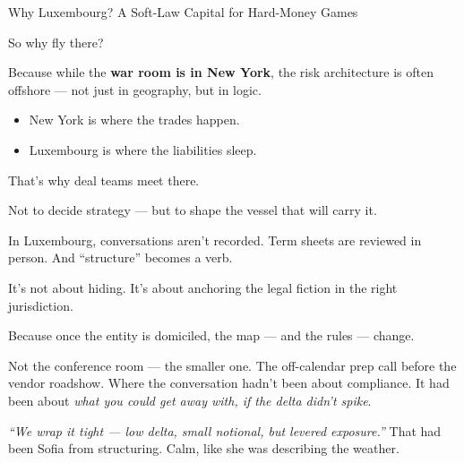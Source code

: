 \begin{HistoricalSidebar}{Why Luxembourg? A Soft-Law Capital for Hard-Money Games}
    \medskip
    
    So why fly there?

    \medskip
    
    Because while the \textbf{war room is in New York}, the risk architecture is often offshore — not just in geography, but in logic.
    
    \medskip
    
    \begin{itemize}
    \item New York is where the trades happen.
    \item Luxembourg is where the liabilities sleep.
    \end{itemize}
    
    That’s why deal teams meet there.

    \medskip
    
    Not to decide strategy — but to shape the vessel that will carry it.

    \medskip
    
    In Luxembourg, conversations aren’t recorded. Term sheets are reviewed in person. And “structure” becomes a verb.
    
    \medskip
    
    It’s not about hiding. It’s about anchoring the legal fiction in the right jurisdiction.

    \medskip
    
    Because once the entity is domiciled, the map — and the rules — change.
    
\end{HistoricalSidebar}

\medskip

Not the conference room — the smaller one. The off-calendar prep call before the vendor roadshow.
Where the conversation hadn’t been about compliance. It had been about \textit{what you could get 
away with, if the delta didn’t spike}.

\textit{“We wrap it tight — low delta, small notional, but levered exposure.”}
That had been Sofia from structuring. Calm, like she was describing the weather.

